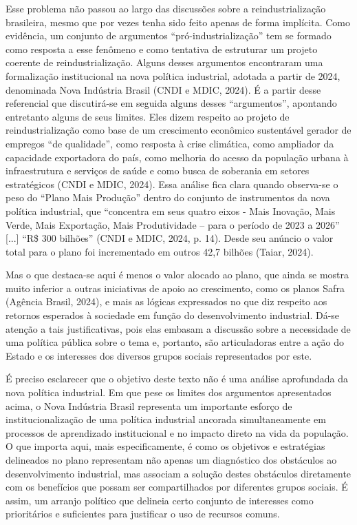 Esse problema não passou ao largo das discussões sobre a
reindustrialização brasileira, mesmo que por vezes tenha sido feito
apenas de forma implícita. Como evidência, um conjunto de argumentos
``pró-industrialização'' tem se formado como resposta a esse fenômeno e
como tentativa de estruturar um projeto coerente de reindustrialização.
Alguns desses argumentos encontraram uma formalização institucional na
nova política industrial, adotada a partir de 2024, denominada Nova
Indústria Brasil (CNDI e MDIC, 2024). É a partir desse referencial que
discutirá-se em seguida alguns desses ``argumentos'', apontando
entretanto alguns de seus limites. Eles dizem respeito ao projeto de
reindustrialização como base de um crescimento econômico sustentável
gerador de empregos ``de qualidade'', como resposta à crise climática,
como ampliador da capacidade exportadora do país, como melhoria do
acesso da população urbana à infraestrutura e serviços de saúde e como
busca de soberania em setores estratégicos (CNDI e MDIC, 2024). Essa
análise fica clara quando observa-se o peso do ``Plano Mais Produção''
dentro do conjunto de instrumentos da nova política industrial, que
``concentra em seus quatro eixos - Mais Inovação, Mais Verde, Mais
Exportação, Mais Produtividade -- para o período de 2023 a 2026''
{[}...{]} ``R\$ 300 bilhões'' (CNDI e MDIC, 2024, p. 14). Desde seu
anúncio o valor total para o plano foi incrementado em outros 42,7
bilhões (Taiar, 2024).

Mas o que destaca-se aqui é menos o valor alocado ao plano, que ainda se
mostra muito inferior a outras iniciativas de apoio ao crescimento, como
os planos Safra (Agência Brasil, 2024), e mais as lógicas expressados no
que diz respeito aos retornos esperados à sociedade em função do
desenvolvimento industrial. Dá-se atenção a tais justificativas, pois
elas embasam a discussão sobre a necessidade de uma política pública
sobre o tema e, portanto, são articuladoras entre a ação do Estado e os
interesses dos diversos grupos sociais representados por este.

É preciso esclarecer que o objetivo deste texto não é uma análise
aprofundada da nova política industrial. Em que pese os limites dos
argumentos apresentados acima, o Nova Indústria Brasil representa um
importante esforço de institucionalização de uma política industrial
ancorada simultaneamente em processos de aprendizado institucional e no
impacto direto na vida da população. O que importa aqui, mais
especificamente, é como os objetivos e estratégias delineados no plano
representam não apenas um diagnóstico dos obstáculos ao desenvolvimento
industrial, mas associam a solução destes obstáculos diretamente com os
benefícios que possam ser compartilhados por diferentes grupos sociais.
É assim, um arranjo político que delineia certo conjunto de interesses
como prioritários e suficientes para justificar o uso de recursos
comuns.

